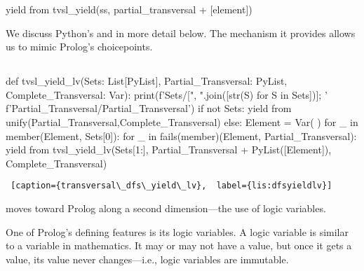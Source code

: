 \begin{python}
yield from tvsl_yield(ss, partial_transversal + [element])
\end{python}

We discuss Python's  and  in more detail below. The mechanism it provides allows us to mimic Prolog's choicepoints.

\subsection{}

\begin{minipage}{\linewidth} \largev   \hrulefill
\begin{python}[numbers=left]
def tvsl_yield_lv(Sets: List[PyList], 
                  Partial_Transversal: PyList,
                  Complete_Transversal: Var):
  print(f'Sets/[{", ".join([str(S) for S in Sets])}]; '
        f'Partial_Transversal/{Partial_Transversal}')
  if not Sets:
    yield from unify(Partial_Transversal,Complete_Transversal)
  else:
    Element = Var( )
    for _ in member(Element, Sets[0]):
      for _ in fails(member)(Element, Partial_Transversal):
        yield from tvsl_yield_lv(Sets[1:], 
                                 Partial_Transversal + PyList([Element]), 
                                 Complete_Transversal)
\end{python}
\begin{lstlisting} [caption={transversal\_dfs\_yield\_lv},  label={lis:dfsyieldlv}]
\end{lstlisting}
\end{minipage}

\smallv

 moves toward Prolog along a second dimension---the use of logic variables.

One of Prolog's defining features is its logic variables. A logic variable is similar to a variable in mathematics. It may or may not have a value, but once it gets a value, its value never changes---i.e., logic variables are immutable.


